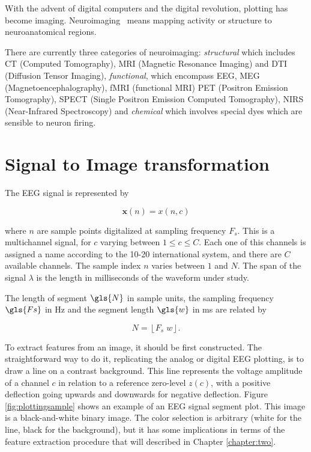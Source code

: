 
\begin{story}[Neuroimaging]
With the advent of digital computers and the digital revolution, plotting has become imaging.  Neuroimaging~\cite{Freeman2013} means mapping activity or structure to neuroanatomical regions.

There are currently three categories of neuroimaging: \textit{structural} which includes CT (Computed Tomography), MRI (Magnetic Resonance Imaging) and DTI (Diffusion Tensor Imaging), \textit{functional}, which encompass EEG, MEG (Magnetoencephalography), fMRI (functional MRI) PET (Positron Emission Tomography), SPECT (Single Positron Emission Computed Tomography), NIRS (Near-Infrared Spectroscopy) and \textit{chemical} which involves special dyes which are sensible to neuron firing.
\end{story}

\section{Signal to Image transformation}

The EEG signal is represented by

\begin{equation}
\mathbf{x}(n) = x(n,c)
\label{eq:zerolevel}
\end{equation}

\noindent where $n$ are sample points digitalized at sampling frequency $F_s$.  This is a multichannel signal, for $c$ varying between  $1 \leq c \leq C$.  Each one of this channels is assigned a name according to the 10-20 international system, and there are $C$ available channels. The sample index $n$ varies between $1$ and $N$.  The span of the signal $\lambda$ is the length in milliseconds of the waveform under study. 

The length of segment $\gls{N}$ in sample units, the sampling frequency $\gls{Fs}$ in \si{\hertz} and the segment length $\gls{w}$ in \si{\ms} are related by

\begin{equation}
N = \left\lfloor F_s \; w \right\rfloor.
\label{eq:segmentlength}
\end{equation}

\vspace{3pt}

To extract features from an image, it should be first constructed.  The straightforward way to do it, replicating the analog or digital EEG plotting, is to draw a line on a contrast background.  This line represents the voltage amplitude of a channel $c$ in relation to a reference zero-level $z(c)$, with a positive deflection going upwards and downwards for negative deflection.  Figure \ref{fig:plottingsample} shows an example of an EEG signal segment plot.  This image is a black-and-white binary image.  The color selection is arbitrary (white for the line, black for the background), but it has some implications in terms of the feature extraction procedure that will described in Chapter \ref{chapter:two}.

